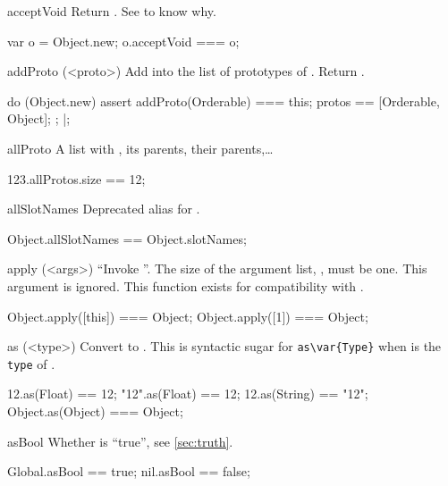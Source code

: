 \begin{urbiscriptapi}
\item[acceptVoid]
  Return \this.  See  to know why.
\begin{urbiassert}
var o = Object.new;
o.acceptVoid === o;
\end{urbiassert}


\item[addProto](<proto>)%
  Add  into the list of prototypes of \this.  Return \this.
\begin{urbiscript}
do (Object.new)
{
  assert
  {
    addProto(Orderable) === this;
    protos == [Orderable, Object];
  };
}|;
\end{urbiscript}

\item[allProto]%
  A list with \this, its parents, their parents,\ldots
\begin{urbiassert}
123.allProtos.size == 12;
\end{urbiassert}

\item[allSlotNames]
  Deprecated alias for .
\begin{urbiassert}
Object.allSlotNames == Object.slotNames;
\end{urbiassert}

\item[apply](<args>)%
  ``Invoke \this''.  The size of the argument list,
  , must be one.  This argument is ignored.  This function
  exists for compatibility with .
\begin{urbiassert}
Object.apply([this]) === Object;
Object.apply([1])    === Object;
\end{urbiassert}

\item[as](<type>)%
  Convert \this to .  This is syntactic sugar for
  \lstinline|as\var{Type}| when  is the \lstinline|type| of
  .
\begin{urbiassert}
     12.as(Float) == 12;
   "12".as(Float) == 12;
    12.as(String) == "12";
Object.as(Object) === Object;
\end{urbiassert}

\item[asBool]
  Whether \this is ``true'', see \autoref{sec:truth}.
\begin{urbiassert}
Global.asBool == true;
nil.asBool ==    false;
\end{urbiassert}


\end{urbiscriptapi}
